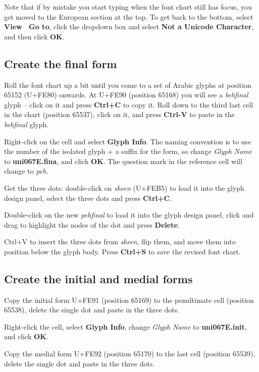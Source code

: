 Note that if by mistake you start typing when the font chart still has focus, you get moved to the European section at the top.  To get back to the bottom, select \textbf{View \textrightarrow\ Go to}, click the dropdown box and select \textbf{Not a Unicode Character},  and then click \textbf{OK}.

\subsection{Create the final form}

Roll the font chart up a bit until you come to a set of Arabic glyphs at position 65152 (U+FE80) onwards.  At U+FE90 (position 65168) you will see a \textit{behfinal} glyph -- click on it and press \textbf{Ctrl+C} to copy it.  Roll down to the third last cell in the chart (position 65537), click on it, and press \textbf{Ctrl-V} to paste in the \textit{behfinal} glyph.

Right-click on the cell and select \textbf{Glyph Info}.  The naming convention is to use the number of the isolated glyph + a suffix for the form, so change \textit{Glyph Name} to \textbf{uni067E.fina},  and click \textbf{OK}.  The question mark in the reference cell will change to \textit{peh}.

Get the three dots: double-click on \textit{sheen} (U+FEB5) to load it into the glyph design panel, select the three dots and press \textbf{Ctrl+C}.

Double-click on the new \textit{pehfinal} to load it into the glyph design panel, click and drag to highlight the nodes of the dot and press \textbf{Delete}.

Ctrl+V to insert the three dots from \textit{sheen}, flip them, and move them into position below the glyph body.  Press \textbf{Ctrl+S} to save the revised font chart.

\subsection{Create the initial and medial forms}

Copy the initial form U+FE91 (position 65169) to the penultimate cell (position 65538), delete the single dot and paste in the three dots.

Right-click the cell, select \textbf{Glyph Info}, change \textit{Glyph Name} to \textbf{uni067E.init}, and click \textbf{OK}.

Copy the medial form U+FE92 (position 65170) to the last cell (position 65539), delete the single dot and paste in the three dots.

